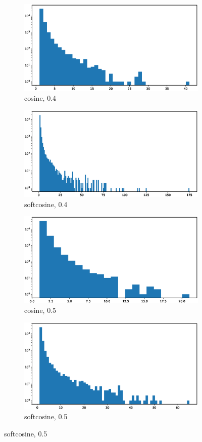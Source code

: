 \documentclass[a4paper,man,natbib,floatsintext,mask]{apa6}
\begin{document}
\begin{figure}[h!]
\begin{subfigure}{.5\textwidth}
  \centering
  \includegraphics[width=.8\linewidth]{figures/cos04.eps}  
  \caption{cosine, 0.4}
  \label{fig:cos04}
\end{subfigure}
\begin{subfigure}{.5\textwidth}
  \centering
  \includegraphics[width=.8\linewidth]{figures/softcos04.eps}  
  \caption{softcosine, 0.4}
  \label{fig:subsoftcos04}
\end{subfigure}

\begin{subfigure}{.5\textwidth}
  \centering
  \includegraphics[width=.8\linewidth]{figures/cos05.eps}  
  \caption{cosine, 0.5}
  \label{fig:sub-cos05}
\end{subfigure}
\begin{subfigure}{.5\textwidth}
  \centering
  \includegraphics[width=.8\linewidth]{figures/softcos05.eps}  
  \caption{softcosine, 0.5}
  \label{fig:sub-softcos05}
\end{subfigure}


\end{figure}
\end{document}
